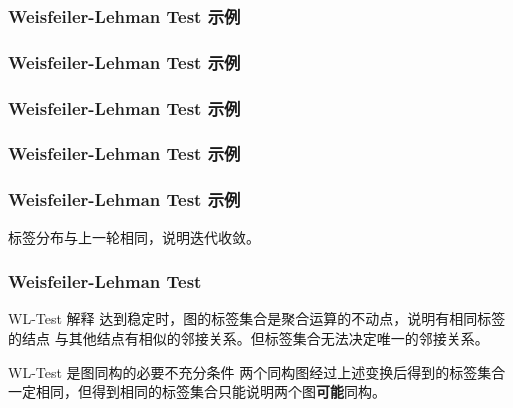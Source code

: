 \documentclass{beamer}
\begin{document}
\begin{frame}

  \frametitle{Weisfeiler-Lehman Test 示例}

\end{frame}

\begin{frame}

  \frametitle{Weisfeiler-Lehman Test 示例}

\end{frame}

\begin{frame}

  \frametitle{Weisfeiler-Lehman Test 示例}

\end{frame}

\begin{frame}

  \frametitle{Weisfeiler-Lehman Test 示例}

\end{frame}

\begin{frame}

  \frametitle{Weisfeiler-Lehman Test 示例}
  标签分布与上一轮相同，说明迭代收敛。
\end{frame}

\begin{frame}

  \frametitle{Weisfeiler-Lehman Test}
  \begin{block}{WL-Test 解释}
    达到稳定时，图的标签集合是聚合运算的不动点，说明有相同标签的结点
    与其他结点有相似的邻接关系。但标签集合无法决定唯一的邻接关系。
  \end{block}
  \begin{alertblock}{WL-Test 是图同构的必要不充分条件}
    两个同构图经过上述变换后得到的标签集合一定相同，但得到相同的标签集合只能说明两个图\textbf{可能}同构。
  \end{alertblock}

\end{frame}
\end{document}
